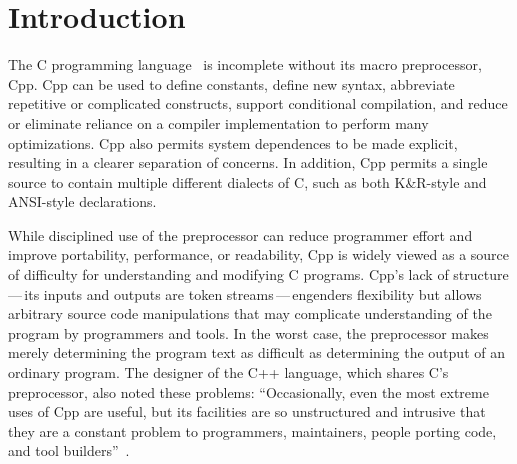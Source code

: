 \documentclass[10pt]{article}
\begin{document}
\bigskip

\section{Introduction}

The C programming language~\cite{KernighanR88,Harbison91} is
incomplete without its macro preprocessor, Cpp.  Cpp can be used to
define constants, define new syntax, abbreviate repetitive or
complicated constructs, support conditional compilation, and 
reduce or eliminate reliance on a compiler implementation to perform 
many optimizations.
Cpp also permits system dependences to be made explicit, resulting in
a clearer separation of concerns.  In addition, Cpp permits a single
source to contain multiple different dialects of C, such as both
K\&R-style and ANSI-style declarations.



While disciplined use of the preprocessor can reduce programmer effort
and improve portability, performance, or readability, Cpp is widely
viewed as a source of difficulty for understanding and modifying C
programs.  Cpp's lack of structure\,---\,its inputs and outputs are
token streams\,---\,engenders flexibility but allows arbitrary source
code manipulations that may complicate understanding of the program by
programmers and tools.  In the worst case, the preprocessor makes
merely determining the program text as difficult as determining the
output of an ordinary program.  The designer of the C++ language,
which shares C's preprocessor, also noted these problems:
``Occasionally, even the most extreme uses of Cpp are useful, but its
facilities are so unstructured and intrusive that they are a constant
problem to programmers, maintainers, people porting code, and tool
builders''~\cite[p.~424]{Stroustrup-DesignEvolution}.
\end{document}
